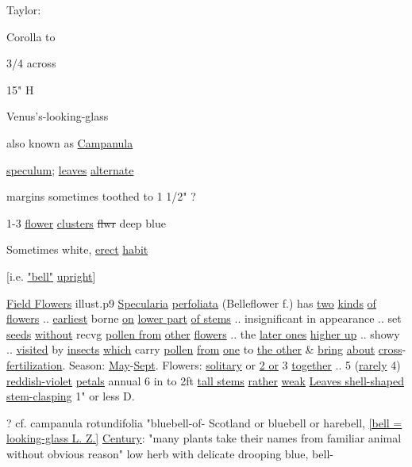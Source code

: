 \documentclass[a4paper]{article}
\begin{document}
\begin{minipage}[t]{0.6\textwidth}
\begin{minipage}[t]{0.3\textwidth}
\begin{flushright}
    Taylor:\par
\end{flushright}
\vspace{5pt}
\small
Corolla to\par
3/4 across\par
15" H\par
\normalfont
\end{minipage}
\begin{minipage}[t]{0.6\textwidth}
Venus's-looking-glass\par
{}
also known as \ul{Campanula}\par
\ul{speculum}; 
\setul{}{2pt}
\ul{leaves} \ul{alternate}\par
margins sometimes toothed to 1 1/2" ?\par
1-3 \ul{flower} \ul{clusters} \sout{flwr} deep blue\par
Sometimes white, \ul{erect} \ul{habit}\par
{[i.e. \ul{"bell"} \ul{upright}]}\par
\end{minipage}
\begin{minipage}[t]{0.9\textwidth}
\ul{Field Flowers}
illust.p9 \ul{Specularia}
\ul{perfoliata} (Belleflower
f.)
\setul{}{2pt}
has \ul{two} \ul{kinds} \ul{of flowers} .. \ul{earliest}
borne \ul{on} \ul{lower part} \ul{of stems} .. insignificant
in appearance .. set \ul{seeds} \ul{without} recvg
\ul{pollen from} \ul{other} \ul{flowers} .. the \ul{later ones}
\ul{higher up} .. showy .. \ul{visited} by \ul{insects}
\ul{which} carry \ul{pollen} \ul{from} \ul{one} to \ul{the other} \& \ul{bring}
\ul{about} \ul{cross}-\ul{fertilization}. Season:
\ul{May}-\ul{Sept}. Flowers: \ul{solitary} or \ul{2 or} 3
\ul{together} .. 5 (\ul{rarely} 4) \ul{reddish-violet} \ul{petals}
annual 6 in to 2ft \ul{tall stems} \ul{rather}
\ul{weak} \ul{Leaves shell-shaped} \ul{stem}\ul{-clasping}
1" or less D.\par 
\color{red}
? cf. campanula rotundifolia "bluebell-of-
Scotland or bluebell or harebell,
\ul{[bell = looking-glass L. Z.]} 
\setul{}{1pt}
\ul{Century}:
"many plants take their names from
familiar animal %
without obvious reason"
low herb with delicate drooping blue, bell-

\end{minipage}
\end{minipage}
\end{document}
